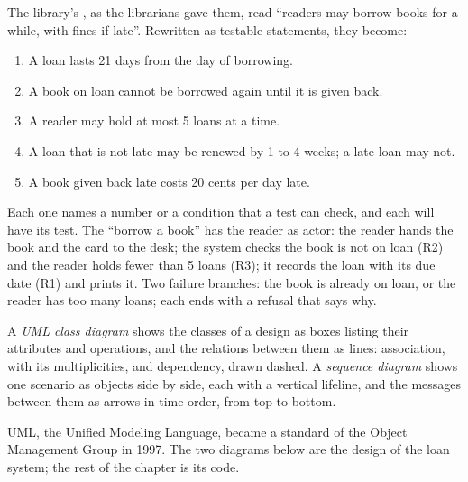 The library's , as the librarians gave them, read ``readers may borrow books for a while, with fines if late''. Rewritten as testable statements, they become:
\begin{enumerate}[label=R\arabic*.]
  \item A loan lasts 21 days from the day of borrowing.
  \item A book on loan cannot be borrowed again until it is given back.
  \item A reader may hold at most 5 loans at a time.
  \item A loan that is not late may be renewed by 1 to 4 weeks; a late loan may not.
  \item A book given back late costs 20 cents per day late.
\end{enumerate}
Each one names a number or a condition that a test can check, and each will have its test. The  ``borrow a book'' has the reader as actor: the reader hands the book and the card to the desk; the system checks the book is not on loan (R2) and the reader holds fewer than 5 loans (R3); it records the loan with its due date (R1) and prints it. Two failure branches: the book is already on loan, or the reader has too many loans; each ends with a refusal that says why.

\begin{definition}\label{def:b3:software-engineering:uml}
A \emph{UML class diagram} shows the classes of a design as boxes listing their attributes and operations, and the relations between them as lines: association, with its multiplicities, and dependency, drawn dashed. A \emph{sequence diagram} shows one scenario as objects side by side, each with a vertical lifeline, and the messages between them as arrows in time order, from top to bottom.
\end{definition}

UML, the Unified Modeling Language, became a standard of the Object Management Group in 1997. %
The two diagrams below are the design of the loan system; the rest of the chapter is its code.

